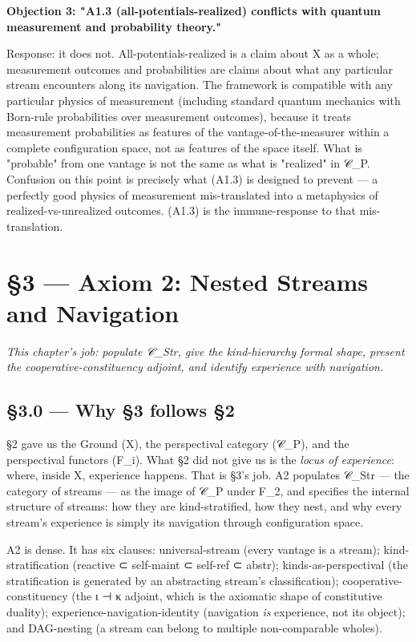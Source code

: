 \documentclass[11pt, openany]{book}
\newcommand{\sectionbreak}{\clearpage}
\begin{document}
\textbf{Objection 3: "A1.3 (all-potentials-realized) conflicts with quantum measurement and probability theory."}

Response: it does not. All-potentials-realized is a claim about X as a whole; measurement outcomes and probabilities are claims about what any particular stream encounters along its navigation. The framework is compatible with any particular physics of measurement (including standard quantum mechanics with Born-rule probabilities over measurement outcomes), because it treats measurement probabilities as features of the vantage-of-the-measurer within a complete configuration space, not as features of the space itself. What is "probable" from one vantage is not the same as what is "realized" in 𝒞\_\allowbreak{}P. Confusion on this point is precisely what (A1.3) is designed to prevent --- a perfectly good physics of measurement mis-translated into a metaphysics of realized-vs-unrealized outcomes. (A1.3) is the immune-response to that mis-translation.

\chapter{§3 — Axiom 2: Nested Streams and Navigation}


\textit{This chapter's job: populate 𝒞\_\allowbreak{}Str, give the kind-hierarchy formal shape, present the cooperative-constituency adjoint, and identify experience with navigation.}

\sectionbreak

\section{§3.0 --- Why §3 follows §2}

§2 gave us the Ground (X), the perspectival category (𝒞\_\allowbreak{}P), and the perspectival functors (F\_\allowbreak{}i). What §2 did not give us is the \textit{locus of experience}: where, inside X, experience happens. That is §3's job. A2 populates 𝒞\_\allowbreak{}Str --- the category of streams --- as the image of 𝒞\_\allowbreak{}P under F\_\allowbreak{}2, and specifies the internal structure of streams: how they are kind-stratified, how they nest, and why every stream's experience is simply its navigation through configuration space.

A2 is dense. It has six clauses: universal-stream (every vantage is a stream); kind-stratification (reactive ⊂ self-maint ⊂ self-ref ⊂ abstr); kinds-as-perspectival (the stratification is generated by an abstracting stream's classification); cooperative-constituency (the ι ⊣ κ adjoint, which is the axiomatic shape of constitutive duality); experience-navigation-identity (navigation \textit{is} experience, not its object); and DAG-nesting (a stream can belong to multiple non-comparable wholes).
\end{document}

